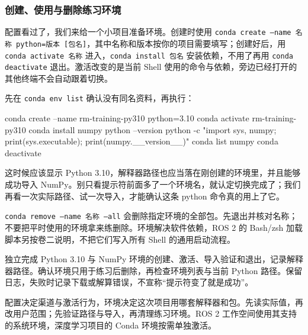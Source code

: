\subsubsection{创建、使用与删除练习环境}
配置看过了，我们来给一个小项目准备环境。创建时使用 \texttt{conda create --name 名称 python=版本 [包名]}，其中名称和版本按你的项目需要填写；创建好后，用 \texttt{conda activate 名称} 进入，\texttt{conda install 包名} 安装依赖，不用了再用 \texttt{conda deactivate} 退出。激活改变的是当前 Shell 使用的命令与依赖，旁边已经打开的其他终端不会自动跟着切换。
\begin{example}
先在 \texttt{conda env list} 确认没有同名资料，再执行：


\begin{tbash}
conda create --name rm-training-py310 python=3.10
conda activate rm-training-py310
conda install numpy
python --version
python -c "import sys, numpy; print(sys.executable); print(numpy.__version__)"
conda list numpy
conda deactivate
\end{tbash}


这时候应该显示 Python 3.10，解释器路径也应当落在刚创建的环境里，并且能够成功导入 NumPy。别只看提示符前面多了一个环境名，就认定切换完成了；我们再看一次实际路径、试一次导入，才能确认这条 python 命令真的用上了它。
\end{example}
\begin{note}
\texttt{conda remove --name 名称 --all} 会删除指定环境的全部包。先退出并核对名称；不要把平时使用的环境拿来练删除。环境解决软件依赖，ROS 2 的 Bash/zsh 加载脚本另按卷二说明，不把它们写入所有 Shell 的通用启动流程。
\end{note}
\begin{exercise}\label{ex:v1-conda-env}
独立完成 Python 3.10 与 NumPy 环境的创建、激活、导入验证和退出，记录解释器路径。确认环境只用于练习后删除，再检查环境列表与当前 Python 路径。保留日志，失败时记录下载或解算错误，不宣称“提示符变了就是成功”。
\end{exercise}
\begin{conclusion}
配置决定渠道与激活行为，环境决定这次项目用哪套解释器和包。先读实际值，再改用户范围；先验证路径与导入，再清理练习环境。ROS 2 工作空间使用其支持的系统环境，深度学习项目的 Conda 环境按需单独激活。
\end{conclusion}
